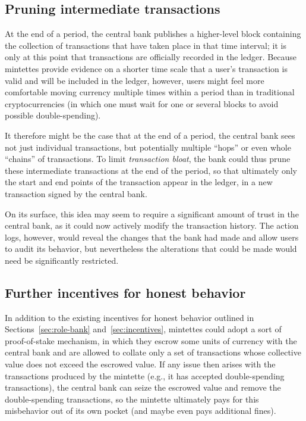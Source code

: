 \documentclass[conference]{IEEEtran}
\begin{document}
\subsection{Pruning intermediate transactions}\label{sec:bloat}

At the end of a period, the central bank publishes a higher-level block
containing the collection of transactions that have taken place in that time
interval; it is only at this point that transactions are officially recorded
in the ledger.  Because mintettes provide evidence on a shorter time scale
that a user's transaction is valid and will be included in the ledger,
however,
users might feel more comfortable moving currency multiple times
within a period than in traditional cryptocurrencies (in which one must wait
for one or several blocks to avoid possible double-spending).

It therefore might be the case that at the end of a period, the central bank
sees not just individual transactions, but
potentially multiple ``hops'' or even whole ``chains'' of transactions.  To
limit \emph{transaction bloat}, the bank could thus prune these intermediate
transactions at the end of the period, so that ultimately only the start and
end points of the transaction appear in the ledger, in a new transaction
signed by the central bank.

On its surface, this idea may seem to require a significant amount of trust in
the central bank, as it could now actively modify the transaction history.
The action logs, however, would reveal the changes that the bank had made and
allow users to audit its behavior, but nevertheless the alterations that could
be made would need be significantly restricted.

\subsection{Further incentives for honest behavior}

In addition to the existing incentives for honest behavior outlined in
Sections~\ref{sec:role-bank} and~\ref{sec:incentives}, mintettes could adopt
a sort of proof-of-stake mechanism, in which they escrow some units
of currency with the central bank and are allowed to collate only a
set of transactions whose collective value does not exceed the escrowed value.
If any issue then arises with the transactions produced by the
mintette (e.g., it has accepted double-spending transactions), the central
bank can seize the escrowed value and remove the double-spending transactions,
so the mintette ultimately pays for this misbehavior out of its own pocket
(and maybe even pays additional fines).
\end{document}
